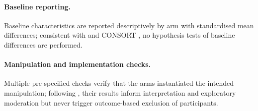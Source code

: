 \paragraph{Baseline reporting.}
Baseline characteristics are reported descriptively by arm with standardised mean differences; consistent with \textcite{senn1994} %
and CONSORT \parencite{hopewell2025}, no hypothesis tests of baseline differences are performed.

\paragraph{Manipulation and implementation checks.}
Multiple pre-specified checks verify that the arms instantiated the intended manipulation; following \textcite{montgomery2018post}, %
their results inform interpretation and exploratory moderation but never trigger outcome-based exclusion of participants.
